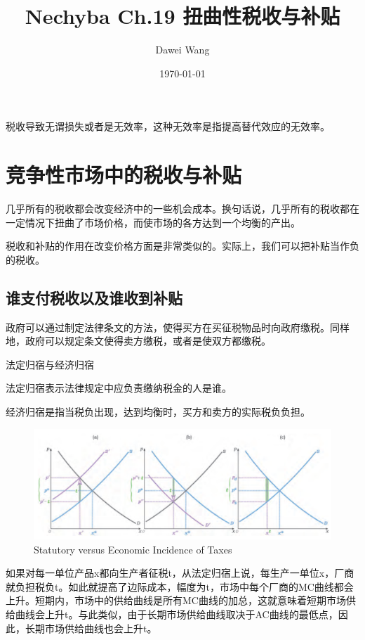 \documentclass{article}
\title{Nechyba Ch.19 扭曲性税收与补贴}
\author{Dawei Wang}
\date{\today}
\begin{document}
	\maketitle
税收导致无谓损失或者是无效率，这种无效率是指提高替代效应的无效率。

\section{竞争性市场中的税收与补贴}
几乎所有的税收都会改变经济中的一些机会成本。换句话说，几乎所有的税收都在一定情况下扭曲了市场价格，而使市场的各方达到一个均衡的产出。

税收和补贴的作用在改变价格方面是非常类似的。实际上，我们可以把补贴当作负的税收。

\subsection{谁支付税收以及谁收到补贴}
政府可以通过制定法律条文的方法，使得买方在买征税物品时向政府缴税。同样地，政府可以规定条文使得卖方缴税，或者是使双方都缴税。

\hspace*{\fill}

法定归宿与经济归宿

法定归宿表示法律规定中应负责缴纳税金的人是谁。

经济归宿是指当税负出现，达到均衡时，买方和卖方的实际税负负担。

\begin{figure}[H] %
	\centering %
	\includegraphics[width=1\textwidth]{19_1} %
	\caption{Statutory versus Economic Incidence of Taxes} %
	\label{Fig.main2} %
\end{figure}

如果对每一单位产品x都向生产者征税t，从法定归宿上说，每生产一单位x，厂商就负担税负t。如此就提高了边际成本，幅度为t，市场中每个厂商的MC曲线都会上升。短期内，市场中的供给曲线是所有MC曲线的加总，这就意味着短期市场供给曲线会上升t。与此类似，由于长期市场供给曲线取决于AC曲线的最低点，因此，长期市场供给曲线也会上升t。
\end{document}
